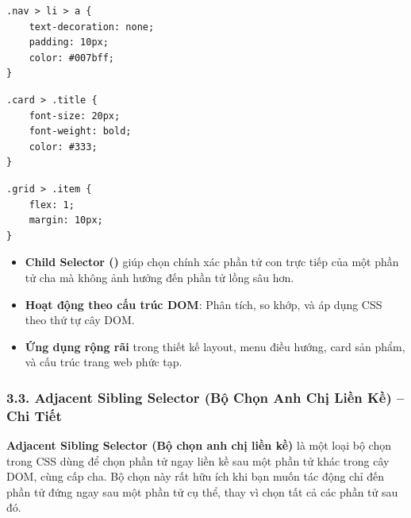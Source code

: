 \begin{codeWindow}
\begin{lstlisting}[language=CSS3]
.nav > li > a {
    text-decoration: none;
    padding: 10px;
    color: #007bff;
}
\end{lstlisting}
\end{codeWindow}

\begin{codeWindow}
\begin{lstlisting}[language=CSS3]
.card > .title {
    font-size: 20px;
    font-weight: bold;
    color: #333;
}
\end{lstlisting}
\end{codeWindow}

\begin{codeWindow}
\begin{lstlisting}[language=CSS3]
.grid > .item {
    flex: 1;
    margin: 10px;
}
\end{lstlisting}
\end{codeWindow}

\begin{tipBox}
\begin{itemize}[leftmargin=1.5em, itemsep=3pt, parsep=0pt]
    \item \textbf{Child Selector (\codeinline{>})} giúp chọn chính xác phần tử con trực tiếp của một phần tử cha mà không ảnh hưởng đến phần tử lồng sâu hơn.
    \item \textbf{Hoạt động theo cấu trúc DOM}: Phân tích, so khớp, và áp dụng CSS theo thứ tự cây DOM.
    \item \textbf{Ứng dụng rộng rãi} trong thiết kế layout, menu điều hướng, card sản phẩm, và cấu trúc trang web phức tạp.
\end{itemize}
\end{tipBox}

\subsubsection{3.3. Adjacent Sibling Selector (Bộ Chọn Anh Chị Liền Kề) -- Chi Tiết}

\begin{conceptBox}
\textbf{Adjacent Sibling Selector (Bộ chọn anh chị liền kề)} là một loại bộ chọn trong CSS dùng để chọn phần tử ngay liền kề sau một phần tử khác trong cây DOM, cùng cấp cha. Bộ chọn này rất hữu ích khi bạn muốn tác động chỉ đến phần tử đứng ngay sau một phần tử cụ thể, thay vì chọn tất cả các phần tử sau đó.
\end{conceptBox}

